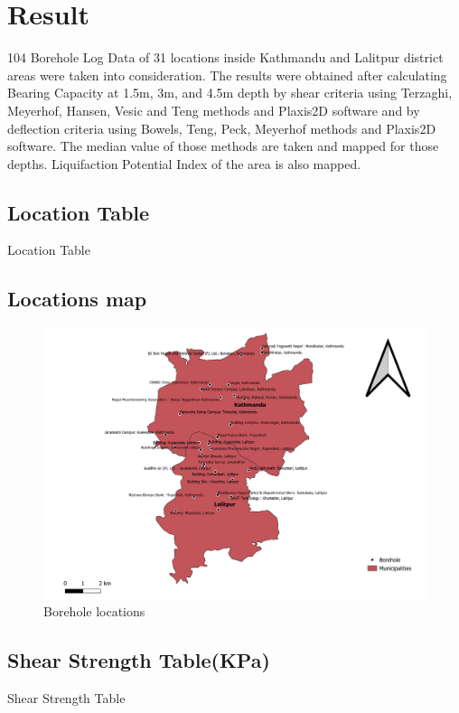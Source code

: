 \chapter{Result}
104 Borehole Log Data of 31 locations inside Kathmandu and Lalitpur district areas were taken into consideration. The results were obtained after calculating Bearing Capacity at 1.5m, 3m, and 4.5m depth by shear criteria using Terzaghi, Meyerhof, Hansen, Vesic and Teng methods and Plaxis2D software and by deflection criteria using Bowels, Teng, Peck, Meyerhof  methods and Plaxis2D software. The median value of those methods are taken and mapped for those depths. Liquifaction Potential Index of the area is also mapped.
\pagebreak

\section{Location Table}
\begin{table}[!h]
\caption{Location Table}

\end{table}
\pagebreak

\begin{landscape}
\section{Locations map}
\begin{figure}[!h]
\centering
\includegraphics[width=0.8\linewidth, height=0.8\textheight,keepaspectratio]{in/map/Borehole2.png}
\caption{Borehole locations}
\end{figure}
\pagebreak
\end{landscape}

\section{Shear Strength Table(KPa)}
\begin{table}[!h]
\caption{Shear Strength Table}

\end{table}
\pagebreak

